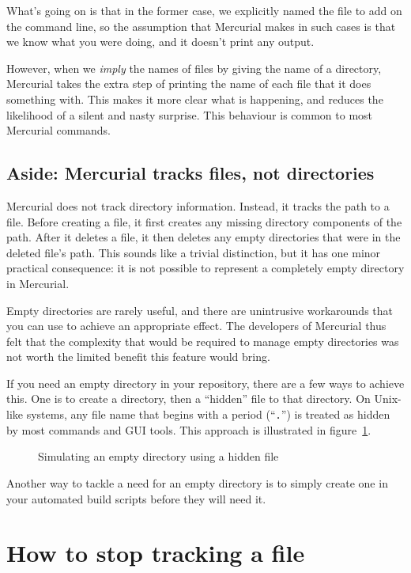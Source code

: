 What's going on is that in the former case, we explicitly named the
file to add on the command line, so the assumption that Mercurial
makes in such cases is that we know what you were doing, and it
doesn't print any output.

However, when we \emph{imply} the names of files by giving the name of
a directory, Mercurial takes the extra step of printing the name of
each file that it does something with.  This makes it more clear what
is happening, and reduces the likelihood of a silent and nasty
surprise.  This behaviour is common to most Mercurial commands.

\subsection{Aside: Mercurial tracks files, not directories}

Mercurial does not track directory information.  Instead, it tracks
the path to a file.  Before creating a file, it first creates any
missing directory components of the path.  After it deletes a file, it
then deletes any empty directories that were in the deleted file's
path.  This sounds like a trivial distinction, but it has one minor
practical consequence: it is not possible to represent a completely
empty directory in Mercurial.

Empty directories are rarely useful, and there are unintrusive
workarounds that you can use to achieve an appropriate effect.  The
developers of Mercurial thus felt that the complexity that would be
required to manage empty directories was not worth the limited benefit
this feature would bring.

If you need an empty directory in your repository, there are a few
ways to achieve this. One is to create a directory, then  a
``hidden'' file to that directory.  On Unix-like systems, any file
name that begins with a period (``\texttt{.}'') is treated as hidden
by most commands and GUI tools.  This approach is illustrated in
figure~\ref{ex:daily:hidden}.

\begin{figure}[ht]
  \caption{Simulating an empty directory using a hidden file}
  \label{ex:daily:hidden}
\end{figure}

Another way to tackle a need for an empty directory is to simply
create one in your automated build scripts before they will need it.

\section{How to stop tracking a file}

